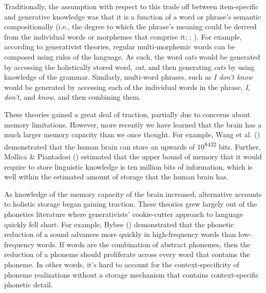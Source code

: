 \documentclass[
  12pt,
]{scrartcl}
\begin{document}
Traditionally, the assumption with respect to this trade off between
item-specific and generative knowledge was that it is a function of a
word or phrase's semantic compositionally (i.e., the degree to which the
phrase's meaning could be derived from the individual words or morphemes
that comprise it; ; ).
For example, according to generativist theories, regular multi-morphemic
words can be composed using rules of the language. As such, the word
\emph{cats} would be generated by accessing the holistically stored
word, \emph{cat}, and then generating \emph{cats} by using knowledge of
the grammar. Similarly, multi-word phrases, such as \emph{I don't know}
would be generated by accessing each of the individual words in the
phrase, \emph{I}, \emph{don't}, and \emph{know}, and then combining
them.

These theories gained a great deal of traction, partially due to
concerns about memory limitations. However, more recently we have
learned that the brain has a much larger memory capacity than we once
thought. For example, Wang et al.
() demonstrated
that the human brain can store an upwards of 10\textsuperscript{8432}
bits. Further, Mollica \& Piantadosi
() estimated that
the upper bound of memory that it would require to store linguistic
knowledge is ten million bits of information, which is well within the
estimated amount of storage that the human brain has.

As knowledge of the memory capacity of the brain increased, alternative
accounts to holistic storage began gaining traction. These theories grew
largely out of the phonetics literature where generativists'
cookie-cutter approach to language quickly fell short. For example,
Bybee () demonstrated
that the phonetic reduction of a sound advances more quickly in
high-frequency words than low-frequency words. If words are the
combination of abstract phonemes, then the reduction of a phoneme should
proliferate across every word that contains the phoneme. In other words,
it's hard to account for the context-specificity of phoneme realizations
without a storage mechanism that contains context-specific phonetic
detail.
\end{document}
